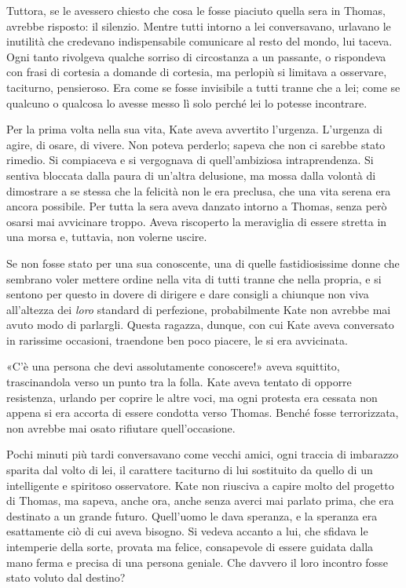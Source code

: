 \documentclass[a4paper,oneside,9pt]{memoir}
\begin{document}
Tuttora, se le avessero chiesto che cosa le fosse piaciuto quella sera in Thomas, avrebbe risposto: il silenzio. Mentre
tutti intorno a lei conversavano, urlavano le inutilità che credevano indispensabile comunicare al resto del mondo, lui
taceva. Ogni tanto rivolgeva qualche sorriso di circostanza a un passante, o rispondeva con frasi di cortesia a
domande di cortesia, ma perlopiù si limitava a osservare, taciturno, pensieroso. Era come se fosse invisibile a tutti
tranne che a lei; come se qualcuno o qualcosa lo avesse messo lì solo perché lei lo potesse incontrare.

Per la prima volta nella sua vita, Kate aveva avvertito l'urgenza. L'urgenza di agire, di osare, di vivere. Non poteva
perderlo; sapeva che non ci sarebbe stato rimedio. Si compiaceva e si vergognava di quell'ambiziosa intraprendenza. Si
sentiva bloccata dalla paura di un'altra delusione, ma mossa dalla volontà di dimostrare a se stessa che la felicità non
le era preclusa, che una vita serena era ancora possibile. Per tutta la sera aveva danzato intorno a Thomas, senza però
osarsi mai avvicinare troppo. Aveva riscoperto la meraviglia di essere stretta in una morsa e, tuttavia, non volerne
uscire.

Se non fosse stato per una sua conoscente, una di quelle fastidiosissime donne che sembrano voler mettere ordine nella
vita di tutti tranne che nella propria, e si sentono per questo in dovere di dirigere e dare consigli a chiunque non
viva all'altezza dei \emph{loro} standard di perfezione, probabilmente Kate non avrebbe mai avuto modo di parlargli.
Questa ragazza, dunque, con cui Kate aveva conversato in rarissime occasioni, traendone ben poco piacere, le si
era avvicinata.

«C'è una persona che devi assolutamente conoscere!» aveva squittito, trascinandola verso un punto tra la folla. Kate
aveva tentato di opporre resistenza, urlando per coprire le altre voci, ma ogni protesta era cessata non appena si era
accorta di essere condotta verso Thomas. Benché fosse terrorizzata, non avrebbe mai osato rifiutare quell'occasione.

Pochi minuti più tardi conversavano come vecchi amici, ogni traccia di imbarazzo sparita dal volto di lei, il carattere
taciturno di lui sostituito da quello di un intelligente e spiritoso osservatore. Kate non riusciva a capire molto del
progetto di Thomas, ma sapeva, anche ora, anche senza averci mai parlato prima, che era destinato a un grande futuro.
Quell'uomo le dava speranza, e la speranza era esattamente ciò di cui aveva bisogno. Si vedeva accanto a lui, che
sfidava le intemperie della sorte, provata ma felice, consapevole di essere guidata dalla mano ferma e precisa di una
persona geniale. Che davvero il loro incontro fosse stato voluto dal destino?
\end{document}
